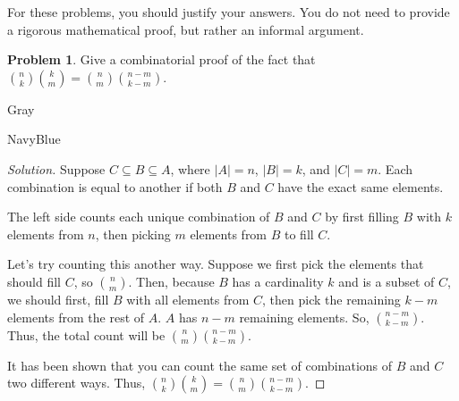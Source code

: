 \documentclass[12pt]{amsart}
\newcounter{problem_number}[section]
\theoremstyle{named}
\newenvironment{soln}
{\begin{color}{Gray}\begin{framed}\begin{color}{NavyBlue}\begin{proof}[Solution]
\doublespacing}
{\end{proof}\end{color}\end{framed}\end{color}}
\theoremstyle{definition}
\newtheorem{problem}{Problem}
\begin{document}
For these problems, you should justify your answers. You do not need to provide a rigorous mathematical proof, but rather an informal argument.

\vspace{5mm}

\begin{problem}
	Give a combinatorial proof of the fact that ${n\choose k}{k\choose m} = {n\choose m}{n-m\choose k-m}$.
\end{problem}

\begin{soln}
    \phantom{ }

	\noindent Suppose $C \subseteq B \subseteq A$, where $|A| = n$, $|B| = k$, and $|C| = m$.
    Each combination is equal to another if both $B$ and $C$ have the exact same elements.

    \phantom{ }

    \noindent The left side counts each unique combination of $B$ and $C$ by first filling $B$ with $k$ 
    elements from $n$, then picking $m$ elements from $B$ to fill $C$. 

    \phantom{ }

    \noindent Let's try counting this another way. Suppose we first pick the elements that should
    fill $C$, so ${n \choose m}$. Then, because $B$ has a cardinality $k$ and is a subset of $C$,
    we should first, fill $B$ with all elements from $C$, then pick the remaining $k - m$ elements
    from the rest of $A$. $A$ has $n - m$ remaining elements. So, ${n-m \choose k-m}$. Thus, the total
    count will be ${n\choose m}{n-m\choose k-m}$. 

    \phantom{ }

    \noindent It has been shown that you can count the same set of combinations of $B$ and $C$
    two different ways. Thus, ${n\choose k}{k\choose m} = {n\choose m}{n-m\choose k-m}$.







\end{soln}
\end{document}
